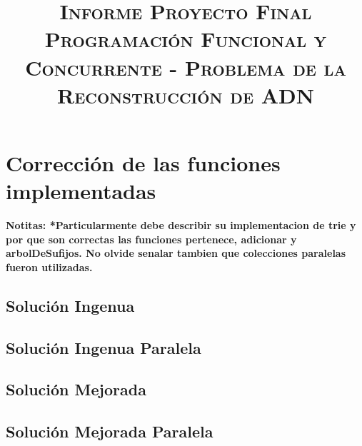 \documentclass[conference]{IEEEtran}
\begin{document}
\title{\huge \textsc{Informe Proyecto Final Programación Funcional y Concurrente - Problema de la Reconstrucción de ADN}\\
}

\author{
\and
{}
}

\maketitle




\section{\textbf{Corrección de las funciones implementadas}}

\textbf{Notitas: *Particularmente debe describir su implementacion
de trie y por que son correctas las funciones pertenece, adicionar y arbolDeSufijos. No
olvide senalar tambien que colecciones paralelas fueron utilizadas.}

\subsection{\textbf{Solución Ingenua}}

\subsection{\textbf{Solución Ingenua Paralela}}

\subsection{\textbf{Solución Mejorada}}

\subsection{\textbf{Solución Mejorada Paralela}}
\end{document}
